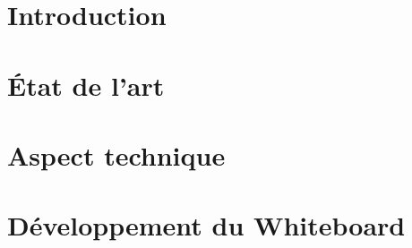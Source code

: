 \documentclass[
    iict, %
    iscl, %
]{heig-tb}
\begin{document}
\maketitle
\frontmatter
\clearemptydoublepage

\preamble
\authentification

\begin{abstract}
  
\end{abstract}

\begin{requirements}
  
\end{requirements}

\clearemptydoublepage
{
  \tableofcontents
}

\printnomenclature
\clearemptydoublepage
{}

\mainmatter
\chapter{Introduction}


\chapter{État de l'art}


\chapter{Aspect technique}


\chapter{Développement du Whiteboard}


%

\clearpage
\printbibliography

\appendix
\appendixpage
\addappheadtotoc



\let\cleardoublepage\clearpage
\backmatter

\label{glossaire}
\printnoidxglossary
\label{index}
\printindex

%
\end{document}
